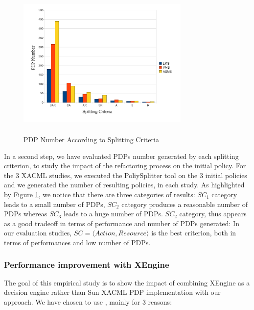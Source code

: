 \begin{figure}[!h]
  \centering
\includegraphics[width=8.5cm, height=7.5cm]{pdpnumber.pdf}
\begin{center}
\caption{PDP Number According to Splitting Criteria}
\label{pdpnumber}
\end{center}
\end{figure} 

In a second step, we have evaluated PDPs number generated by each splitting criterion, to study the impact of the refactoring process on the initial policy. 
For the 3 XACML studies, we executed the PoliySplitter tool on the 3 initial policies and we generated the number of resulting policies, in each study. 
As highlighted by Figure \ref{pdpnumber}, we notice that there are three
 categories of results: $SC_{1}$ category leads to a small number of PDPs, $SC_{2}$ category produces a reasonable number of PDPs whereas $SC_{3}$ leads to a huge 
number of PDPs. $SC_{2}$ category, thus appears as a good tradeoff in terms of performance and number of 
PDPs generated: In our evaluation studies, $SC=\langle Action, Resource\rangle$ is the best criterion, both in terms of performances and low number of PDPs.


\subsubsection{Performance improvement with XEngine}
The goal of this empirical study is to show the impact of combining XEngine as a decision engine rather than Sun XACML PDP implementation with our approach. 
We have chosen to use \cite{Xengine}, mainly for 3 reasons:

